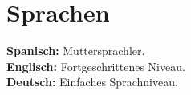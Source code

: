 \documentclass[letterpaper,11pt]{article}
\begin{document}
\section{Sprachen}
\begin{itemize}[leftmargin=0.15in, label={}]
   \small{\item{
    \textbf{Spanisch: }{Muttersprachler.} \\
    \textbf{Englisch: }{Fortgeschrittenes Niveau.} \\
    \textbf{Deutsch: }{Einfaches Sprachniveau.} \\
   }}
\end{itemize}
\end{document}
